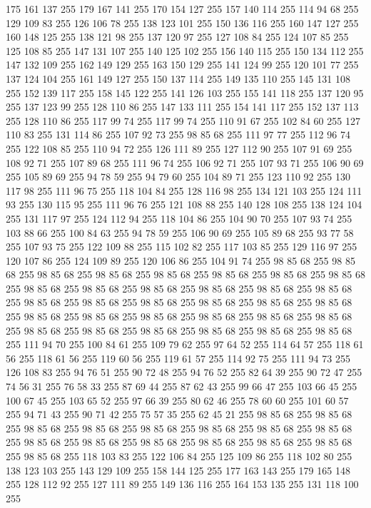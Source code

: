 175 161 137 255 179 167 141 255 170 154 127 255 157 140 114 255 114 94 68 255 129 109 83 255 126 106 78 255 138 123 101 255 150 136 116 255 160 147 127 255 160 148 125 255 138 121 98 255 137 120 97 255 127 108 84 255 124 107 85 255 125 108 85 255 147 131 107 255 140 125 102 255 156 140 115 255 150 134 112 255 147 132 109 255 162 149 129 255 163 150 129 255 141 124 99 255 120 101 77 255 137 124 104 255 161 149 127 255 150 137 114 255 149 135 110 255 145 131 108 255 152 139 117 255 158 145 122 255 141 126 103 255 155 141 118 255 137 120 95 255 137 123 99 255 128 110 86 255 147 133 111 255 154 141 117 255 152 137 113 255 128 110 86 255 117 99 74 255 117 99 74 255 110 91 67 255 102 84 60 255 127 110 83 255 131 114 86 255 107 92 73 255 98 85 68 255 111 97 77 255 112 96 74 255 122 108 85 255 110 94 72 255 126 111 89 255 127 112 90 255 107 91 69 255 108 92 71 255 107 89 68 255 111 96 74 255 106 92 71 255 107 93 71 255 106 90 69 255 105 89 69 255 94 78 59 255
94 79 60 255 104 89 71 255 123 110 92 255 130 117 98 255 111 96 75 255 118 104 84 255 128 116 98 255 134 121 103 255 124 111 93 255 130 115 95 255 111 96 76 255 121 108 88 255 140 128 108 255 138 124 104 255 131 117 97 255 124 112 94 255 118 104 86 255 104 90 70 255 107 93 74 255 103 88 66 255 100 84 63 255 94 78 59 255 106 90 69 255 105 89 68 255 93 77 58 255 107 93 75 255 122 109 88 255 115 102 82 255 117 103 85 255 129 116 97 255 120 107 86 255 124 109 89 255 120 106 86 255 104 91 74 255 98 85 68 255 98 85 68 255 98 85 68 255 98 85 68 255 98 85 68 255 98 85 68 255 98 85 68 255 98 85 68 255 98 85 68 255 98 85 68 255 98 85 68 255 98 85 68 255 98 85 68 255 98 85 68 255 98 85 68 255 98 85 68 255 98 85 68 255 98 85 68 255 98 85 68 255 98 85 68 255 98 85 68 255 98 85 68 255 98 85 68 255 98 85 68 255 98 85 68 255 98 85 68 255 98 85 68 255 98 85 68 255 98 85 68 255 98 85 68 255
98 85 68 255 98 85 68 255 111 94 70 255 100 84 61 255 109 79 62 255 97 64 52 255 114 64 57 255 118 61 56 255 118 61 56 255 119 60 56 255 119 61 57 255 114 92 75 255 111 94 73 255 126 108 83 255 94 76 51 255 90 72 48 255 94 76 52 255 82 64 39 255 90 72 47 255 74 56 31 255 76 58 33 255 87 69 44 255 87 62 43 255 99 66 47 255 103 66 45 255 100 67 45 255 103 65 52 255 97 66 39 255 80 62 46 255 78 60 60 255 101 60 57 255 94 71 43 255 90 71 42 255 75 57 35 255 62 45 21 255 98 85 68 255 98 85 68 255 98 85 68 255 98 85 68 255 98 85 68 255 98 85 68 255 98 85 68 255 98 85 68 255 98 85 68 255 98 85 68 255 98 85 68 255 98 85 68 255 98 85 68 255 98 85 68 255 98 85 68 255 118 103 83 255 122 106 84 255 125 109 86 255 118 102 80 255 138 123 103 255 143 129 109 255 158 144 125 255 177 163 143 255 179 165 148 255 128 112 92 255 127 111 89 255 149 136 116 255 164 153 135 255 131 118 100 255
